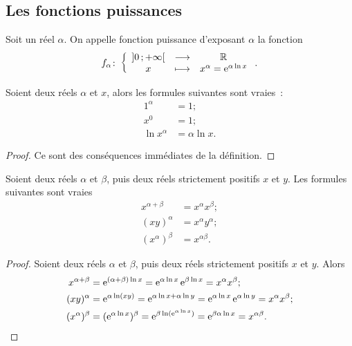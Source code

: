 \subsection{Les fonctions puissances}
\label{subsec:chap1-fonctionspuissances}
\begin{defdef}
  Soit un réel \(\alpha\). On appelle fonction puissance d'exposant \(\alpha\) la fonction
  \begin{equation}
    f_{\alpha}\colon \left\{\begin{array}{ccc} \left] 0 \, ;  +\infty \right[ & \longrightarrow &\mathbb{R}\\ x & \longmapsto & x^{\alpha}=\operatorname{e}^{\alpha \ln x} \end{array} \right..
  \end{equation}
\end{defdef}
%
\begin{prop}
  Soient deux réels \(\alpha\) et \(x\), alors les formules suivantes sont vraies~:
  \begin{align}
      1^{\alpha}&=1; \\
      x^0&=1; \\
      \ln x^{\alpha} &= \alpha \ln x.
  \end{align}
\end{prop}
\begin{proof}
  Ce sont des conséquences immédiates de la définition.
\end{proof}
%
\begin{prop}
  Soient deux réels \(\alpha\) et \(\beta\), puis deux réels strictement positifs \(x\) et \(y\). Les formules suivantes sont vraies
  \begin{align}
      x^{\alpha+\beta} &= x^\alpha x^\beta;\\
      (xy)^\alpha &= x^\alpha y^\alpha;\\
      (x^\alpha)^\beta &= x^{\alpha\beta}.
  \end{align}
\end{prop}
\begin{proof}
  Soient deux réels \(\alpha\) et \(\beta\), puis deux réels strictement positifs \(x\) et \(y\). Alors
  \begin{align}
      x^{\alpha+\beta}&=\operatorname{e}^{(\alpha+\beta)\ln x}=\operatorname{e}^{\alpha \ln x} \operatorname{e}^{\beta \ln x}=x^\alpha x^\beta;\\
      (xy)^\alpha&=\operatorname{e}^{\alpha \ln (xy)}=\operatorname{e}^{\alpha \ln x +\alpha \ln y}=\operatorname{e}^{\alpha \ln x} \operatorname{e}^{\alpha \ln y}=x^\alpha x^\beta ;\\
      (x^\alpha)^\beta&=(\operatorname{e}^{\alpha \ln x})^\beta=\operatorname{e}^{\beta \ln(\operatorname{e}^{\alpha \ln x})}=\operatorname{e}^{\beta \alpha \ln x}=x^{\alpha \beta}.
  \end{align}
\end{proof}


